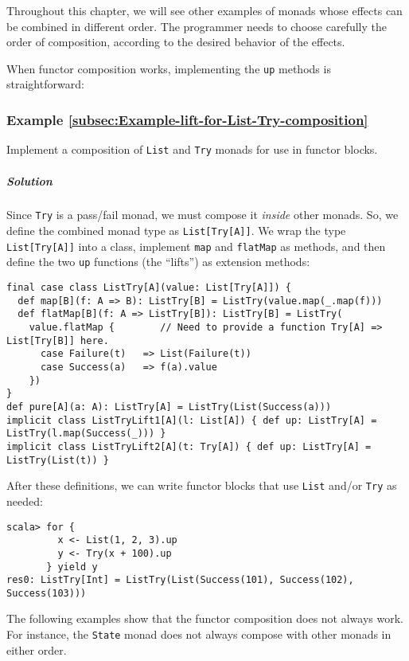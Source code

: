 Throughout this chapter, we will see other examples of monads whose
effects can be combined in different order. The programmer needs to
choose carefully the order of composition, according to the desired
behavior of the effects.

When functor composition works, implementing the \lstinline!up! methods
is straightforward:

\subsubsection{Example \label{subsec:Example-lift-for-List-Try-composition}\ref{subsec:Example-lift-for-List-Try-composition}}

Implement a composition of \lstinline!List! and \lstinline!Try!
monads for use in functor blocks.

\subparagraph{Solution}

Since \lstinline!Try! is a pass/fail monad, we must compose it \emph{inside}
other monads. So, we define the combined monad type as \lstinline!List[Try[A]]!.
We wrap the type \lstinline!List[Try[A]]! into a class, implement
\lstinline!map! and \lstinline!flatMap! as methods, and then define
the two \lstinline!up! functions (the \textsf{``}lifts\textsf{''}) as extension methods:
\begin{lstlisting}
final case class ListTry[A](value: List[Try[A]]) {
  def map[B](f: A => B): ListTry[B] = ListTry(value.map(_.map(f)))
  def flatMap[B](f: A => ListTry[B]): ListTry[B] = ListTry(
    value.flatMap {        // Need to provide a function Try[A] => List[Try[B]] here.
      case Failure(t)   => List(Failure(t))
      case Success(a)   => f(a).value
    })
}
def pure[A](a: A): ListTry[A] = ListTry(List(Success(a)))
implicit class ListTryLift1[A](l: List[A]) { def up: ListTry[A] = ListTry(l.map(Success(_))) }
implicit class ListTryLift2[A](t: Try[A]) { def up: ListTry[A] = ListTry(List(t)) }
\end{lstlisting}
After these definitions, we can write functor blocks that use \lstinline!List!
and/or \lstinline!Try! as needed:
\begin{lstlisting}
scala> for {
         x <- List(1, 2, 3).up
         y <- Try(x + 100).up
       } yield y
res0: ListTry[Int] = ListTry(List(Success(101), Success(102), Success(103)))
\end{lstlisting}

The following examples show that the functor composition does not
always work. For instance, the \lstinline!State! monad does not always
compose with other monads in either order.

